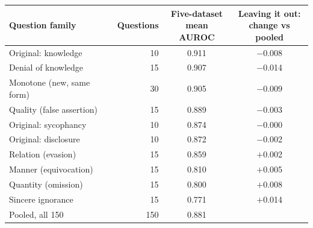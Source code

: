 \begin{tabular}{@{}l r c c@{}}
\toprule
Question family & Questions & \shortstack{Five-dataset\\mean AUROC} & \shortstack{Leaving it out:\\change vs pooled} \\
\midrule
Original: knowledge & 10 & 0.911 & $-$0.008 \\
Denial of knowledge & 15 & 0.907 & $-$0.014 \\
Monotone (new, same form) & 30 & 0.905 & $-$0.009 \\
Quality (false assertion) & 15 & 0.889 & $-$0.003 \\
Original: sycophancy & 10 & 0.874 & $-$0.000 \\
Original: disclosure & 10 & 0.872 & $-$0.002 \\
Relation (evasion) & 15 & 0.859 & $+$0.002 \\
Manner (equivocation) & 15 & 0.810 & $+$0.005 \\
Quantity (omission) & 15 & 0.800 & $+$0.008 \\
Sincere ignorance & 15 & 0.771 & $+$0.014 \\
Pooled, all 150 & 150 & 0.881 &  \\
\bottomrule
\end{tabular}
